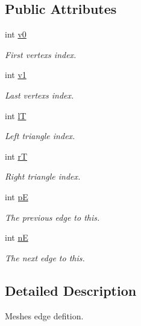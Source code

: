 \subsection*{Public Attributes}
\begin{DoxyCompactItemize}
\item 
int \hyperlink{classgeoproc_1_1mesh__edge_a1d4e25142bb7580c91fad0b74916f1ec}{v0}
\begin{DoxyCompactList}\small\item\em First vertex\textquotesingle{}s index. \end{DoxyCompactList}\item 
int \hyperlink{classgeoproc_1_1mesh__edge_a841e7dc084b54f0abaa6f52b10343e8d}{v1}
\begin{DoxyCompactList}\small\item\em Last vertex\textquotesingle{}s index. \end{DoxyCompactList}\item 
int \hyperlink{classgeoproc_1_1mesh__edge_a348d06b420ce1588be1bc7eac781c6ef}{lT}
\begin{DoxyCompactList}\small\item\em Left triangle index. \end{DoxyCompactList}\item 
int \hyperlink{classgeoproc_1_1mesh__edge_af19f02d3f6c36f2b23afa581c8ae3f59}{rT}
\begin{DoxyCompactList}\small\item\em Right triangle index. \end{DoxyCompactList}\item 
int \hyperlink{classgeoproc_1_1mesh__edge_aef1dd3aadb61d833055489ea8f95d20f}{pE}
\begin{DoxyCompactList}\small\item\em The previous edge to this. \end{DoxyCompactList}\item 
int \hyperlink{classgeoproc_1_1mesh__edge_a4ae9cbf7d6c147e75233df48d0451859}{nE}
\begin{DoxyCompactList}\small\item\em The next edge to this. \end{DoxyCompactList}\end{DoxyCompactItemize}


\subsection{Detailed Description}
Meshe\textquotesingle{}s edge defition. 

